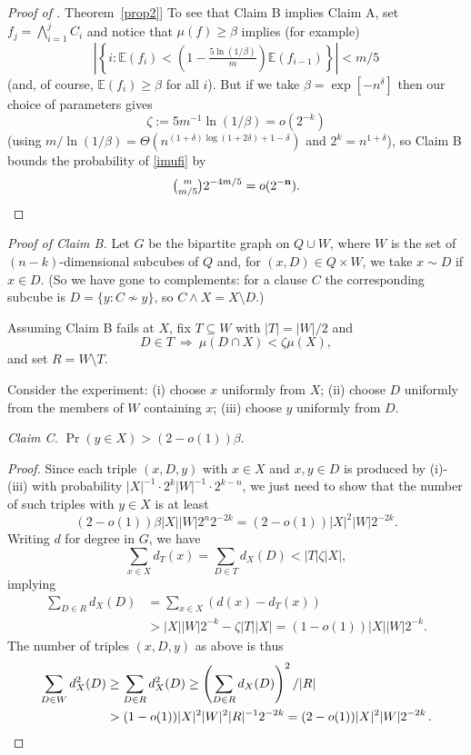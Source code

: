 \documentclass[11pt]{article}
\numberwithin{equation}{section}
\theoremstyle{definition}
\theoremstyle{plain}
\newcommand{\expref}[2]{\hyperref[#2]{#1~\ref{#2}}}
\newcommand{\nn}[0]{{\bf n}}
\newcommand{\beq}[1]{\begin{equation}\label{#1}}
\newcommand{\enq}[0]{\end{equation}}
\newcommand{\mn}[0]{\medskip\noindent}
\newcommand{\sub}[0]{\subseteq}
\newcommand{\sm}[0]{\setminus}
\newcommand{\Ra}[0]{\Rightarrow}
\newcommand{\TTT}[0]{R}
\newcommand{\SSS}[0]{T}
\newcommand{\0}[0]{\emptyset}
\newcommand{\Cc}[0]{\tbinom}
\newcommand{\gb}[0]{\beta }
\newcommand{\gd}[0]{\delta }
\newcommand{\gz}[0]{\zeta}
\begin{document}
\begin{proof}[Proof of \expref{Theorem}{prop2}]
\medskip
To see that Claim B implies Claim A,
set $f_j=\bigwedge_{i=1}^jC_i$ and notice that $\mu(f) \geq \gb$
implies (for example)
\beq{imufi}
%
%
\left|\left\{i: \mathbb E (f_i) <\left(1-\tfrac{5\ln(1/\gb)}{m}\right)
\mathbb E (f_{i-1})\right\}\right| < m/5
%
\enq
(and, of course, $\mathbb E (f_i)\geq \gb$ for all $i$).
But if we take
$\gb =\exp[-n^{\gd}]$ then our choice of parameters gives
$$\gz:=5m^{-1}\ln(1/\gb) =o(2^{-k})$$
(using $m/\ln (1/\gb) =
\Theta(n^{(1+\gd)\log (1+2\gd)+1-\gd})$ and
$2^k = n^{1+\gd}$),
so Claim B bounds the probability of \eqref{imufi} by
%
\begin{equation*}
\Cc{m}{m/5} 2^{-4m/5} =o(2^{-\nn}).   \qedhere    %
\end{equation*}
%
\end{proof}   %

\mn
\emph{Proof of Claim B.}
Let $G$ be the bipartite graph on
$Q\cup W$, where $W$ is the set of $(n-k)$-dimensional
subcubes of $Q$ and, for $(x,D)\in Q\times W$,
we take $x\sim D$ if $x\in D$.
(So %
we have  %
gone to complements:  for a clause $C$
the corresponding subcube is $D=\{y:C\not\sim y\}$,
so $C\wedge X =X\sm D$.)

Assuming Claim B fails at $X$, fix $\SSS \sub W$ with $|\SSS |=|W|/2$ and
$$D\in \SSS
  ~\Ra ~\mu (D\cap X) < \gz\mu(X),$$
and set $\TTT =W\sm \SSS $.

%
Consider the experiment:  %
(i) choose $x$ uniformly from $X$;
(ii)  choose $D$ uniformly from the members of $W$ containing $x$;
(iii)  choose $y$ uniformly from $D$.


\mn
\emph{Claim C.}  $\Pr(y\in X)> (2-o(1))\gb$.


\mn
\begin{proof}   %
%
Since each triple $(x,D,y)$ with $x\in X$ and $x,y\in D$ is
produced by (i)-(iii) with probability
$|X|^{-1}\cdot 2^k|W|^{-1}\cdot 2^{k-n}$,
we just need to show that the number of such triples with
$y\in X$ is at least
$$
(2-o(1))\gb |X||W|2^n2^{-2k}  = (2-o(1))|X|^2|W|2^{-2k}.
$$
Writing $d$ for degree in $G$, we have
$$
\sum_{x\in X}d_\SSS(x) =\sum_{D\in \SSS }d_X(D) < |\SSS |\gz
 |X|,
$$
implying
%
\begin{align*}
\sum_{D\in \TTT }d_X(D)& = 
\sum_{x\in X}(d(x)-d_\SSS (x))\\
&> |X||W|2^{-k} - \gz |\SSS ||X| = (1-o(1))|X||W|2^{-k}.
\end{align*}   %
The number of %
triples $(x,D,y)$  %
as above is thus
%
\begin{align*}
\sum_{D\in W} d_X^2(D)
&\geq
\sum_{D\in \TTT } d_X^2(D)
\geq
\left(\sum_{D\in \TTT } d_X(D)\right)^2/|\TTT |\\   %
&> (1-o(1))|X|^2|W|^2|\TTT |^{-1}2^{-2k}
= (2-o(1))|X|^2|W|2^{-2k}\,.
 \qedhere                          
\end{align*}   %
%
\end{proof}   %
\end{document}
